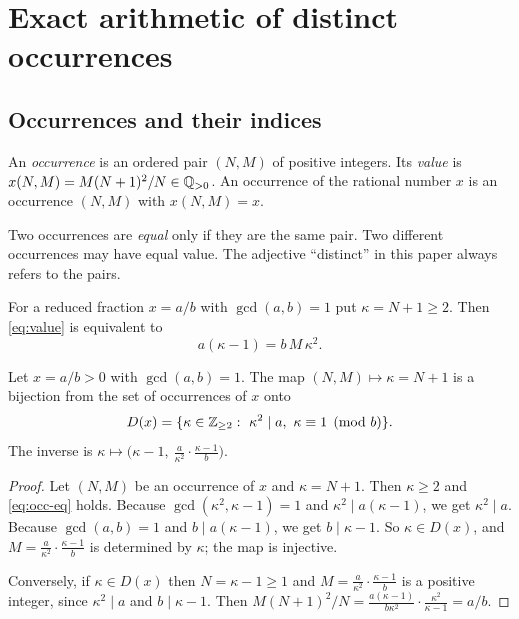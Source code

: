 \section{Exact arithmetic of distinct occurrences}\label{sec:arith}

\subsection{Occurrences and their indices}

\begin{definition}[Occurrence]\label{def:occurrence}
An \emph{occurrence} is an ordered pair $(N,M)$ of positive integers. Its \emph{value} is $x(N,M)=M(N+1)^2/N\in\mathbb Q_{>0}$. An occurrence of the rational number $x$ is an occurrence $(N,M)$ with $x(N,M)=x$.
\end{definition}

Two occurrences are \emph{equal} only if they are the same pair. Two different occurrences may have equal value. The adjective ``distinct'' in this paper always refers to the pairs.

For a reduced fraction $x=a/b$ with $\gcd(a,b)=1$ put $\kappa=N+1\ge2$. Then \eqref{eq:value} is equivalent to
\begin{equation}\label{eq:occ-eq}
  a(\kappa-1)=b\,M\,\kappa^2.
\end{equation}

\begin{proposition}\label{prop:bij}
Let $x=a/b>0$ with $\gcd(a,b)=1$. The map $(N,M)\mapsto\kappa=N+1$ is a bijection from the set of occurrences of $x$ onto
\[
  D(x)=\{\kappa\in\Z_{\ge2}:\ \kappa^2\mid a,\ \kappa\equiv1\pmod b\}.
\]
The inverse is $\kappa\mapsto\bigl(\kappa-1,\ \tfrac{a}{\kappa^2}\cdot\tfrac{\kappa-1}{b}\bigr)$.
\end{proposition}
\begin{proof}
Let $(N,M)$ be an occurrence of $x$ and $\kappa=N+1$. Then $\kappa\ge2$ and \eqref{eq:occ-eq} holds. Because $\gcd(\kappa^2,\kappa-1)=1$ and $\kappa^2\mid a(\kappa-1)$, we get $\kappa^2\mid a$. Because $\gcd(a,b)=1$ and $b\mid a(\kappa-1)$, we get $b\mid\kappa-1$. So $\kappa\in D(x)$, and $M=\frac a{\kappa^2}\cdot\frac{\kappa-1}b$ is determined by $\kappa$; the map is injective.

Conversely, if $\kappa\in D(x)$ then $N=\kappa-1\ge1$ and $M=\frac a{\kappa^2}\cdot\frac{\kappa-1}b$ is a positive integer, since $\kappa^2\mid a$ and $b\mid\kappa-1$. Then $M(N+1)^2/N=\frac{a(\kappa-1)}{b\kappa^2}\cdot\frac{\kappa^2}{\kappa-1}=a/b$.
\end{proof}

